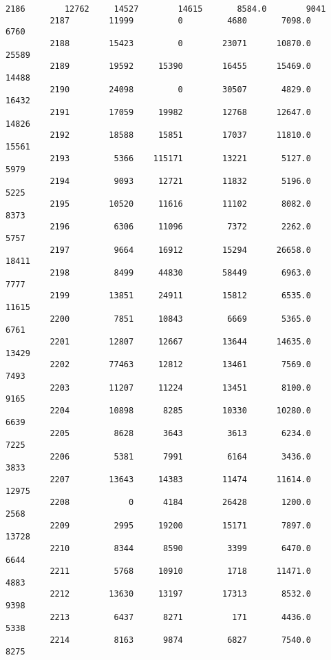 \documentclass[11pt]{llncs}
\begin{document}
\begin{Verbatim}[commandchars=\\\{\}]
         2186        12762     14527        14615       8584.0        9041   
         2187        11999         0         4680       7098.0        6760   
         2188        15423         0        23071      10870.0       25589   
         2189        19592     15390        16455      15469.0       14488   
         2190        24098         0        30507       4829.0       16432   
         2191        17059     19982        12768      12647.0       14826   
         2192        18588     15851        17037      11810.0       15561   
         2193         5366    115171        13221       5127.0        5979   
         2194         9093     12721        11832       5196.0        5225   
         2195        10520     11616        11102       8082.0        8373   
         2196         6306     11096         7372       2262.0        5757   
         2197         9664     16912        15294      26658.0       18411   
         2198         8499     44830        58449       6963.0        7777   
         2199        13851     24911        15812       6535.0       11615   
         2200         7851     10843         6669       5365.0        6761   
         2201        12807     12667        13644      14635.0       13429   
         2202        77463     12812        13461       7569.0        7493   
         2203        11207     11224        13451       8100.0        9165   
         2204        10898      8285        10330      10280.0        6639   
         2205         8628      3643         3613       6234.0        7225   
         2206         5381      7991         6164       3436.0        3833   
         2207        13643     14383        11474      11614.0       12975   
         2208            0      4184        26428       1200.0        2568   
         2209         2995     19200        15171       7897.0       13728   
         2210         8344      8590         3399       6470.0        6644   
         2211         5768     10910         1718      11471.0        4883   
         2212        13630     13197        17313       8532.0        9398   
         2213         6437      8271          171       4436.0        5338   
         2214         8163      9874         6827       7540.0        8275   
         

\end{Verbatim}
\end{document}

